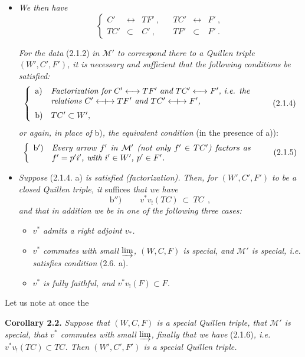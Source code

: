 \documentclass[11pt]{article}
\newcommand{\msp}[1]{\marginpar{\footnotesize [#1]}}
\newcommand{\M}{\mathcal{M}}
\newcommand{\Qcouple}{\mathrel{\leftarrow\mkern-9mu{+}\mkern-9mu\rightarrow}}
\begin{document}
\begin{itemize}
\item[1°)] \textit{We then have}
\[
\left\{
\begin{array}{rclcrcl}
C' & \longleftrightarrow & TF'\ , & & TC' & \longleftrightarrow & F'\ ,\\
TC' & \subset & C'\ , & & TF' & \subset & F'\ .
\end{array}\right.
\tag*{(2.1.3)}
\]

\textit{For the data} (2.1.2) \textit{in $\M'$ to correspond there to a Quillen triple $(W',C',F')$, it is necessary and sufficient that the following conditions be satisfied:}
\msp{page 16}
\[
\left\{
\begin{array}{ll}
\text{a)} & \parbox[t]{0.7\textwidth}{\textit{Factorization for $C' \longleftrightarrow TF'$ and $TC' \longleftrightarrow F'$, i.e. the relations $C' \Qcouple TF'$ and $TC' \Qcouple F'$,}}\\[4ex]
\text{b)} & TC' \subset W',
\end{array}\right. %
\tag*{(2.1.4)}
\]
\textit{or again, in place of} b)\textit{, the equivalent condition} (in the presence of a)):
\[
\left\{
\begin{array}{ll}
\text{b$'$)} & \parbox[t]{0.7\textwidth}{\textit{Every arrow $f'$ in $\M'$ (not only $f' \in TC'$) factors as $f' = p'i'$, with $i' \in W'$, $p' \in F'$.}}
\end{array}\right.
\tag*{(2.1.5)}
\]
\item[2°)] \textit{Suppose} (2.1.4. a) \textit{is satisfied (factorization). Then, for $(W',C',F')$ to be a closed Quillen triple, it} suffices \textit{that we have}
\[
\text{b$''$)}\qquad \boxed{\ v^*v_!(TC)\ \subset\ TC\ }\ ,
\tag*{(2.1.6)}
\]
\textit{and that in addition we be in one of the following three cases:}
\begin{itemize}
\item[A)] \textit{$v^*$ admits a right adjoint $v_*$.}
\item[B)] \textit{$v^*$ commutes with small} $\varinjlim$\textit{, $(W,C,F)$ is special, and $\M'$ is special, i.e. satisfies condition} (2.6. a).
\item[C)] \textit{$v^*$ is fully faithful, and $v^*v_!(F) \subset F$.}
\end{itemize}
\end{itemize}
Let us note at once the

\textbf{Corollary 2.2.} \textit{Suppose that $(W,C,F)$ is a special Quillen triple, that $\M'$ is special, that $v^*$ commutes with small} $\varinjlim$\textit{, finally that we have} (2.1.6)\textit{, i.e. $v^*v_!(TC) \subset TC$. Then $(W',C',F')$ is a special Quillen triple.}
\end{document}
